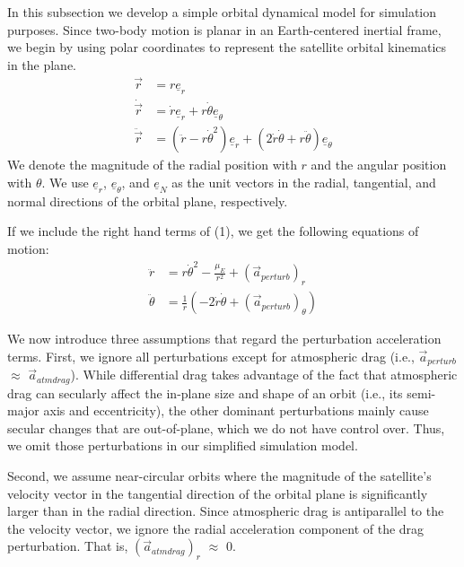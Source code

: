 \documentclass[letterpaper, 10 pt, conference]{ieeeconf}  %
\begin{document}
In this subsection we develop a simple orbital dynamical model for simulation purposes. Since two-body motion is planar in an Earth-centered inertial frame, we begin by using polar coordinates to represent the satellite orbital kinematics in the plane.
\begin{subequations}
\begin{align}
\vec{r}           &= r\underline{e}_r \\
\dot{\vec{r}}   &= \dot{r}\underline{e}_r + r\dot{\theta}\underline{e}_{\theta} \\
\ddot{\vec{r}} &= \left( \ddot{r}-r\dot{\theta}^2 \right)\underline{e}_r + \left( 2\dot{r}\dot{\theta} + r\ddot{\theta} \right)\underline{e}_{\theta}
\end{align}
\end{subequations}
We denote the magnitude of the radial position with $r$ and the angular position with $\theta$. We use $\underline{e}_r$, $\underline{e}_{\theta}$, and $\underline{e}_N$ as the unit vectors in the radial, tangential, and normal directions of the orbital plane, respectively.

If we include the right hand terms of (1), we get the following equations of motion:
\begin{subequations}
\begin{align}
\ddot{r} &= r\dot{\theta}^2 - \frac{\mu_{\scriptscriptstyle E}}{r^2} + (\vec{a}_{perturb})_r \\
\ddot{\theta} &= \frac{1}{r} \left( -2\dot{r}\dot{\theta} + (\vec{a}_{perturb})_{\theta} \right)
\end{align}
\end{subequations}

We now introduce three assumptions that regard the perturbation acceleration terms. First, we ignore all perturbations except for atmospheric drag (i.e., $\vec{a}_{perturb}$ $\approx$ $\vec{a}_{atmdrag}$). While differential drag takes advantage of the fact that atmospheric drag can secularly affect the in-plane size and shape of an orbit (i.e., its semi-major axis and eccentricity), the other dominant perturbations mainly cause secular changes that are out-of-plane, which we do not have control over. Thus, we omit those perturbations in our simplified simulation model.

Second, we assume near-circular orbits where the magnitude of the satellite's velocity vector in the tangential direction of the orbital plane is significantly larger than in the radial direction. Since atmospheric drag is antiparallel to the the velocity vector, we ignore the radial acceleration component of the drag perturbation. That is, $(\vec{a}_{atmdrag})_r$ $\approx$ $0$.
\end{document}
